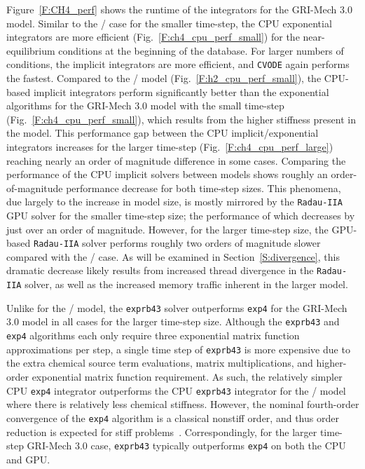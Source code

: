 \documentclass[preprint]{elsarticle}
\begin{document}
Figure~\ref{F:CH4_perf} shows the runtime of the integrators for the GRI-Mech 3.0 model.
Similar to the \slash{} case for the smaller time-step, the CPU exponential integrators are more efficient (Fig.~\ref{F:ch4_cpu_perf_small}) for the near-equilibrium conditions at the beginning of the database.
For larger numbers of conditions, the implicit integrators are more efficient, and \texttt{CVODE} again performs the fastest.
Compared to the \slash{} model (Fig.~\ref{F:h2_cpu_perf_small}), the CPU-based implicit integrators perform significantly better than the exponential algorithms for the GRI-Mech 3.0 model with the small time-step (Fig.~\ref{F:ch4_cpu_perf_small}), which results from the higher stiffness present in the model.
This performance gap between the CPU implicit\slash exponential integrators increases for the larger time-step (Fig.~\ref{F:ch4_cpu_perf_large}) reaching nearly an order of magnitude difference in some cases.
Comparing the performance of the CPU implicit solvers between models shows roughly an order-of-magnitude performance decrease for both time-step sizes.
This phenomena, due largely to the increase in model size, is mostly mirrored by the \texttt{Radau-IIA} GPU solver for the smaller time-step size; the performance of which decreases by just over an order of magnitude.
However, for the larger time-step size, the GPU-based \texttt{Radau-IIA} solver performs roughly two orders of magnitude slower compared with the \slash{} case.
As will be examined in Section~\ref{S:divergence}, this dramatic decrease likely results from increased thread divergence in the \texttt{Radau-IIA} solver, as well as the increased memory traffic inherent in the larger model.

Unlike for the \slash{} model, the \texttt{exprb43} solver outperforms \texttt{exp4} for the GRI-Mech 3.0 model in all cases for the larger time-step size.
Although the \texttt{exprb43} and \texttt{exp4} algorithms each only require three exponential matrix function approximations per step, a single time step of \texttt{exprb43} is more expensive due to the extra chemical source term evaluations, matrix multiplications, and higher-order exponential matrix function requirement.
As such, the relatively simpler CPU \texttt{exp4} integrator outperforms the CPU \texttt{exprb43} integrator for the \slash{} model where there is relatively less chemical stiffness.
However, the nominal fourth-order convergence of the \texttt{exp4} algorithm is a classical nonstiff order, and thus order reduction is expected for stiff problems~\cite{ANU:7701740,Bisetti:2012jw}.
Correspondingly, for the larger time-step GRI-Mech 3.0 case, \texttt{exprb43} typically outperforms \texttt{exp4} on both the CPU and GPU.
\end{document}
